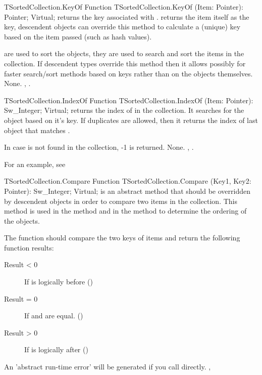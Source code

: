 \begin{function}{TSortedCollection.KeyOf}
\Declaration
Function TSortedCollection.KeyOf (Item: Pointer): Pointer; Virtual;
\Description
{} returns the key associated with .
 returns the item itself as the key, descendent
objects can override this method to calculate a (unique) key based on the
item passed (such as hash values).

 are used to sort the objects, they are used to search and sort
the items in the collection. If descendent types override this method then
it allows possibly for faster search/sort methods based on keys rather than
on the objects themselves.
\Errors
None.
\SeeAlso
{},
.
\end{function}

\begin{function}{TSortedCollection.IndexOf}
\Declaration
Function TSortedCollection.IndexOf (Item: Pointer): Sw\_Integer; Virtual;
\Description
{} returns the index of  in the collection. It searches
for the object based on it's key. If duplicates are allowed, then it returns 
the index of last object that matches .

In case  is not found in the collection, -1 is returned.
\Errors
None.
\SeeAlso
{},
.
\end{function}

For an example, see 

\begin{function}{TSortedCollection.Compare}
\Declaration
Function TSortedCollection.Compare (Key1, Key2: Pointer): Sw\_Integer; Virtual;
\Description
{} is an abstract method that should be overridden by descendent
objects in order to compare two items in the collection. This method is used
in the  method and in the
 method to determine the ordering of
the objects.

The function should compare the two keys of items and return the following
function results:
\begin{description}
\item [Result < 0] If  is logically before 
()
\item [Result = 0] If  and  are equal. ()
\item [Result > 0] If  is logically after 
()
\end{description}
\Errors
An 'abstract run-time error' will be generated if you call
 directly.
\SeeAlso
{},
\end{function}

